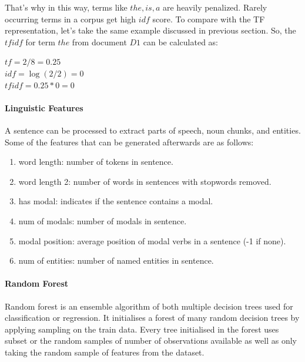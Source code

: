That's why in this way,  terms like $the, is, a$ are heavily penalized.  Rarely occurring terms in a corpus get high $idf$ score. To compare with the TF representation, let's take the same example discussed in previous section. So, the $tfidf$ for term $the$ from document $D1$ can be calculated as:
\begin{center}
	$tf = 2/8 = 0.25$\\
	$idf = \log(2/2) = 0$\\
	$tfidf = 0.25*0 = 0$
\end{center}

\paragraph{Linguistic Features}\label{sec:ling_ftrs}
A sentence can be processed to extract parts of speech, noun chunks, and entities. Some of the features that can be generated afterwards are as follows:

\begin{enumerate}
    \item word length: number of tokens in sentence.
    \item word length 2: number of words in sentences with stopwords removed.
    \item has modal: indicates if the sentence contains a modal.
    \item num of modals: number of modals in sentence.
    \item modal position: average position of modal verbs in a sentence (-1 if none).
    \item num of entities: number of named entities in sentence.
\end{enumerate}

\paragraph{Random Forest}
Random forest \cite{breiman2001random} is an ensemble algorithm of both multiple decision trees used for classification or regression. It initialises a forest of many random decision trees by applying sampling on the train data. Every tree initialised in the forest uses subset or the random samples of number of observations available as well as only taking the random sample of features from the dataset.


